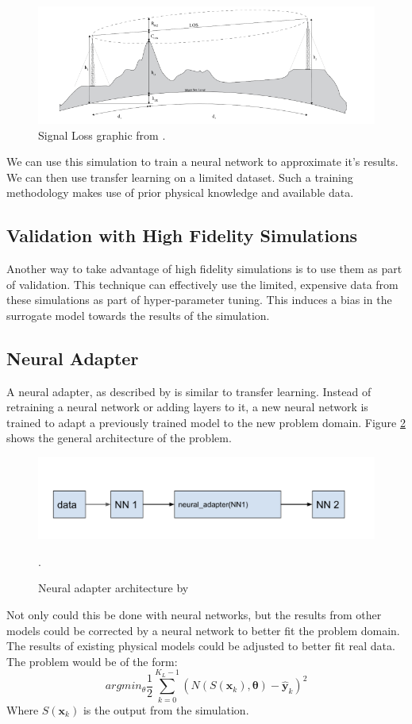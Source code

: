 \documentclass[]{article}
\begin{document}
\begin{figure}
	\centering
	\includegraphics[width=1.0\linewidth]{images/SignalLoss}
	\caption[SigProp]{Signal Loss graphic from \cite{Nicole_SigProp}.}
	\label{fig:signalloss}
\end{figure}

We can use this simulation to train a neural network to approximate it's results.  We can then use transfer learning on a limited dataset.  Such a training methodology makes use of prior physical knowledge and available data.

\subsection{Validation with High Fidelity Simulations}
Another way to take advantage of high fidelity simulations is to use them as part of validation.  This technique can effectively use the limited, expensive data from these simulations as part of hyper-parameter tuning.  This induces a bias in the surrogate model towards the results of the simulation.
\subsection{Neural Adapter}
A neural adapter, as described by \cite{zubov2021neuralpde} is similar to transfer learning.  Instead of retraining a neural network or adding layers to it, a new neural network is trained to adapt a previously trained model to the new problem domain.  Figure \ref{fig:neuraladapter} shows the general architecture of the problem.  
\begin{figure}
	\centering
	\includegraphics[width=1.0\linewidth]{images/neural_adapter}
	\caption[neural adapter]{Neural adapter architecture by \cite{zubov2021neuralpde}}.
	\label{fig:neuraladapter}
\end{figure}
Not only could this be done with neural networks, but the results from other models could be corrected by a neural network to better fit the problem domain.  The results of existing physical models could be adjusted to better fit real data.  The problem would be of the form:
\begin{equation}
arg min_\theta \frac{1}{2}\sum_{k=0}^{K_L - 1}(N(S(\textbf{x}_k), \boldsymbol{\theta}) - \hat{\textbf{y}}_k)^2
\end{equation}
Where $S(\textbf{x}_k)$ is the output from the simulation.
\end{document}
